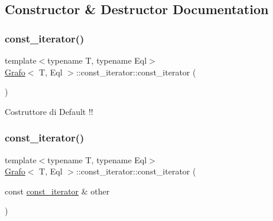 \subsection{Constructor \& Destructor Documentation}
\mbox{\label{classGrafo_1_1const__iterator_afcfb368167c1949b56e8f8b0b9c24402}} 
\subsubsection{\texorpdfstring{const\+\_\+iterator()}{const\_iterator()}\hspace{0.1cm}{\footnotesize\ttfamily [1/2]}}
{\footnotesize\ttfamily template$<$typename T, typename Eql$>$ \\
\hyperlink{classGrafo}{Grafo}$<$ T, Eql $>$\+::const\+\_\+iterator\+::const\+\_\+iterator (\begin{DoxyParamCaption}{ }\end{DoxyParamCaption})\hspace{0.3cm}{\ttfamily [inline]}}

Costruttore di Default !! \mbox{\label{classGrafo_1_1const__iterator_a3b00734352764f21e47bcce86ab4d2fe}} 
\subsubsection{\texorpdfstring{const\+\_\+iterator()}{const\_iterator()}\hspace{0.1cm}{\footnotesize\ttfamily [2/2]}}
{\footnotesize\ttfamily template$<$typename T, typename Eql$>$ \\
\hyperlink{classGrafo}{Grafo}$<$ T, Eql $>$\+::const\+\_\+iterator\+::const\+\_\+iterator (\begin{DoxyParamCaption}\item[{const \hyperlink{classGrafo_1_1const__iterator}{const\+\_\+iterator} \&}]{other }\end{DoxyParamCaption})\hspace{0.3cm}{\ttfamily [inline]}}

